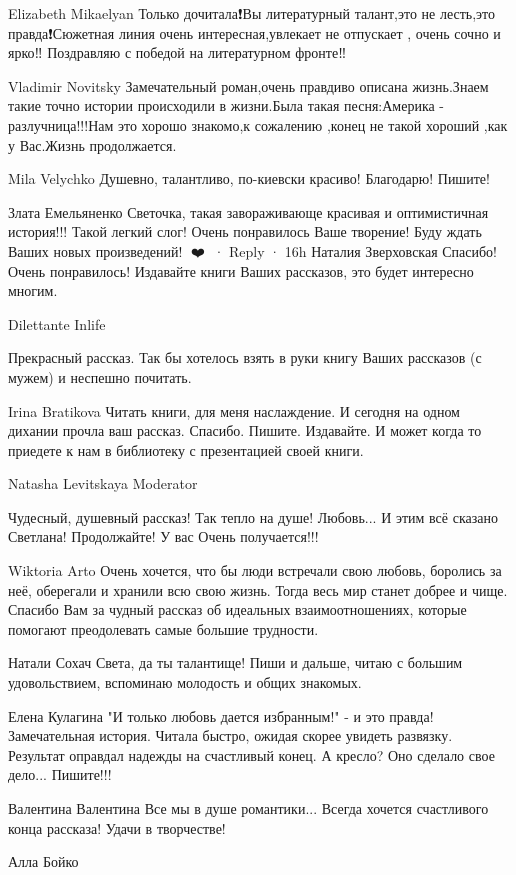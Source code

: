 Elizabeth Mikaelyan
Только дочитала❗Вы литературный талант,это не лесть,это правда❗Сюжетная линия очень интересная,увлекает не отпускает ,
очень сочно и ярко‼️ Поздравляю с победой на литературном фронте‼️👏

Vladimir Novitsky
Замечательный роман,очень правдиво описана жизнь.Знаем такие точно истории происходили в жизни.Была такая песня:Америка - разлучница!!!Нам это хорошо знакомо,к сожалению ,конец не такой хороший ,как у Вас.Жизнь продолжается.

Mila Velychko
Душевно, талантливо, по-киевски красиво! Благодарю! Пишите!

Злата Емельяненко
Светочка, такая завораживающе красивая и оптимистичная история!!! Такой легкий слог! Очень понравилось Ваше творение! Буду ждать Ваших новых произведений! 👏❤️👏
 · Reply · 16h
Наталия Зверховская
Спасибо! Очень понравилось! Издавайте книги Ваших рассказов, это будет интересно многим.

Dilettante Inlife

Прекрасный рассказ. Так бы хотелось взять в руки книгу Ваших рассказов (с мужем) и неспешно почитать.

Irina Bratikova
Читать книги, для меня наслаждение. И сегодня на одном дихании прочла ваш рассказ. Спасибо. Пишите. Издавайте. И может когда то приедете к нам в библиотеку с презентацией своей книги.

Natasha Levitskaya
Moderator

Чудесный, душевный рассказ! Так тепло на душе! Любовь... И этим всё сказано Светлана! Продолжайте! У вас Очень получается!!!

Wiktoria Arto
Очень хочется, что бы люди встречали свою любовь, боролись за неё, оберегали и хранили всю свою жизнь. Тогда весь мир станет добрее и чище. Спасибо Вам за чудный рассказ об идеальных взаимоотношениях, которые помогают преодолевать самые большие трудности.

Натали Сохач
Света, да ты талантище! Пиши и дальше, читаю с большим удовольствием, вспоминаю молодость и общих знакомых.

Елена Кулагина
"И только любовь дается избранным!" - и это правда! Замечательная история. Читала быстро, ожидая скорее увидеть развязку. Результат оправдал надежды на счастливый конец. А кресло? Оно сделало свое дело... Пишите!!!

Валентина Валентина
Все мы в душе романтики... Всегда хочется счастливого конца рассказа! Удачи в творчестве!


Алла Бойко

